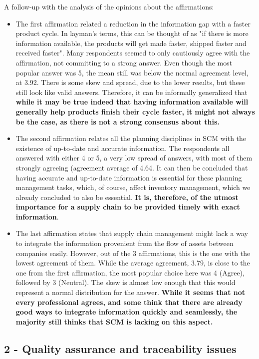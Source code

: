 A follow-up with the analysis of the opinions about the affirmations:
\begin{itemize}
  \item The first affirmation related a reduction in the information gap with a faster product cycle. In layman's terms, this can be thought of as "if there is more information available, the products will get made faster, shipped faster and received faster". Many respondents seemed to only cautiously agree with the affirmation, not committing to a strong answer. Even though the most popular answer was 5, the mean still was below the normal agreement level, at 3.92. There is some skew and spread, due to the lower results, but these still look like valid answers. Therefore, it can be informally generalized that \textbf{while it may be true indeed that having information available will generally help products finish their cycle faster, it might not always be the case, as there is not a strong consensus about this.}
  \item The second affirmation relates all the planning disciplines in SCM with the existence of up-to-date and accurate information. The respondents all answered with either 4 or 5, a very low spread of answers, with most of them strongly agreeing (agreement average of 4.64. It can then be concluded that having accurate and up-to-date information is essential for these planning management tasks, which, of course, affect inventory management, which we already concluded to also be essential. \textbf{It is, therefore, of the utmost importance for a supply chain to be provided timely with exact information}.
  \item The last affirmation states that supply chain management might lack a way to integrate the information provenient from the flow of assets between companies easily. However, out of the 3 affirmations, this is the one with the lowest agreement of them. While the average agreement, 3.79, is close to the one from the first affirmation, the most popular choice here was 4 (Agree), followed by 3 (Neutral). The skew is almost low enough that this would represent a normal distribution for the answer. \textbf{While it seems that not every professional agrees, and some think that there are already good ways to integrate information quickly and seamlessly, the majority still thinks that SCM is lacking on this aspect.}
\end{itemize}

\subsection*{2 - Quality assurance and traceability issues}

